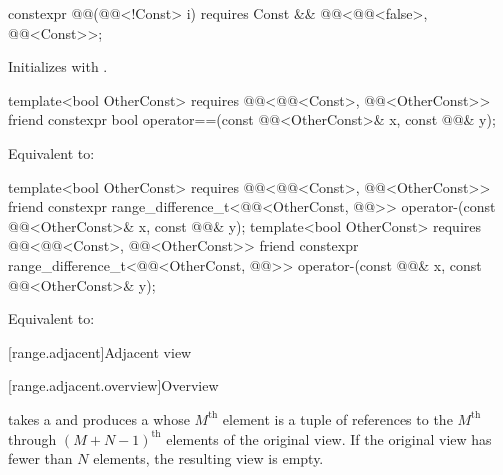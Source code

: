 \begin{itemdecl}
constexpr @@(@@<!Const> i)
  requires Const && @@<@@<false>, @@<Const>>;
\end{itemdecl}

\begin{itemdescr}
\pnum
\effects
Initializes  with .
\end{itemdescr}

\begin{itemdecl}
template<bool OtherConst>
  requires @@<@@<Const>, @@<OtherConst>>
friend constexpr bool operator==(const @@<OtherConst>& x, const @@& y);
\end{itemdecl}

\begin{itemdescr}
\pnum
\effects
Equivalent to: 
\end{itemdescr}

\begin{itemdecl}
template<bool OtherConst>
  requires @@<@@<Const>, @@<OtherConst>>
friend constexpr range_difference_t<@@<OtherConst, @@>>
  operator-(const @@<OtherConst>& x, const @@& y);
template<bool OtherConst>
  requires @@<@@<Const>, @@<OtherConst>>
friend constexpr range_difference_t<@@<OtherConst, @@>>
  operator-(const @@& x, const @@<OtherConst>& y);
\end{itemdecl}

\begin{itemdescr}
\pnum
\effects
Equivalent to: 
\end{itemdescr}

[range.adjacent]{Adjacent view}

[range.adjacent.overview]{Overview}

\pnum
{}%
 takes a  and
produces a  whose $M^\text{th}$ element is
a tuple of references to
the $M^\text{th}$ through $(M + N - 1)^\text{th}$ elements of
the original view.
If the original view has fewer than $N$ elements, the resulting view is empty.

